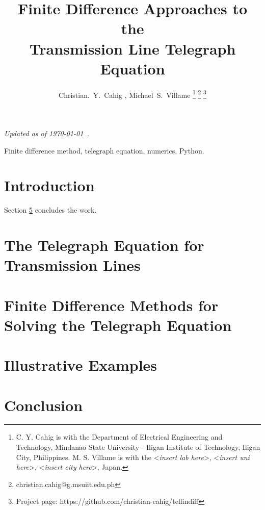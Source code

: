 \documentclass[journal, a4paper]{IEEEtran}
\title{Finite Difference Approaches to the\\Transmission Line Telegraph Equation}
\author{
	Christian.~Y.~Cahig \textsuperscript{\faIcon[regular]{envelope}}, Michael~S.~Villame%
\thanks{
	C. Y. Cahig is with the
	Department of Electrical Engineering and Technology,
	Mindanao State University - Iligan Institute of Technology,
	Iligan City, Philippines.
	M. S. Villame is with the 
	<\textit{insert lab here}>,
	<\textit{insert uni here}>,
	<\textit{insert city here}>, Japan.
}%
\thanks{\faIcon[regular]{envelope} {\color{blue}christian.cahig@g.msuiit.edu.ph}}%
\thanks{\faIcon{github} Project page: {\color{blue}https://github.com/christian-cahig/telfindiff}}
}
\begin{document}
\maketitle

\noindent
\textit{Updated as of {\today\ \currenttime}.}\\

\begin{abstract}
\lipsum[4]
\end{abstract}

\begin{IEEEkeywords}
Finite difference method, telegraph equation, numerics, Python.
\end{IEEEkeywords}

\section{Introduction}
\label{sec: Introduction}



Section \ref{sec: Conclusion} concludes the work.

\section{The Telegraph Equation for Transmission Lines}
\label{sec: The Telegraph Equation for Transmission Lines}


\section{Finite Difference Methods for\\Solving the Telegraph Equation}
\label{sec: Finite Difference Methods for Solving the Telegraph Equation}


\section{Illustrative Examples}
\label{sec: Illustrative Examples}


\section{Conclusion}
\label{sec: Conclusion}

\lipsum[28]





\end{document}
